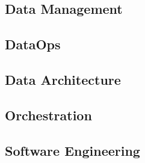\subsection*{Data Management}
\subsection*{DataOps}
\subsection*{Data Architecture}
\subsection*{Orchestration}
\subsection*{Software Engineering}

















